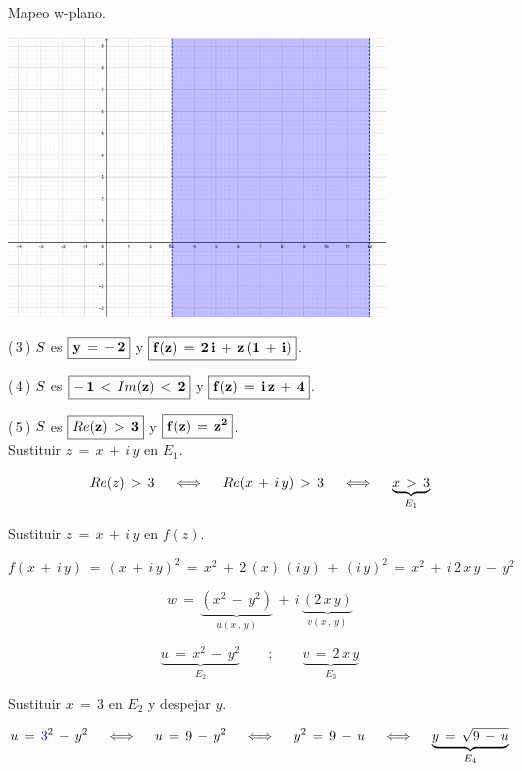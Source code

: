 \documentclass[a4paper,11pt,openany]{book}
\begin{document}
\textcolor{ao(english)}{} Mapeo w-plano.

\begin{center}
     \includegraphics[width=10cm]{Mapeo-Ej-2-w}
\end{center}

\textcolor{ao(english)}{(\,3\,)} $\mathnormal{S}$ es $\boxed{\bf{y\,=\,-\,2}}$ y $\boxed{\bf{f(z)\,=\,2\,i\,+\,z\,(1\,+\,i)}}$.

\textcolor{ao(english)}{(\,4\,)} $\mathnormal{S}$ es $\boxed{\bf{-\,1\,<\,\mathnormal{Im}(z)\,<\,2}}$ y $\boxed{\bf{f(z)\,=\,i\,z\,+\,4}}$.

\textcolor{ao(english)}{(\,5\,)} $\mathnormal{S}$ es $\boxed{\bf{\mathnormal{Re}(z)\,>\,3}}$ y $\boxed{\bf{f(z)\,=\,z^{2}}}$.\\

\textcolor{ao(english)}{} Sustituir $z\,=\,x\,+\,i\,y$ en $E_{1}$.

$$\mathnormal{Re}(z)\,>\,3 \quad\iff\quad \mathnormal{Re}(x\,+\,i\,y)\,>\,3 \quad\iff\quad \underbrace{x\,>\,3}_{E_{1}}$$

\textcolor{ao(english)}{} Sustituir $z\,=\,x\,+\,i\,y$ en $f(z)$.

$$f(x\,+\,i\,y)\,=\,(x\,+\,i\,y)^{2}\,=\,x^{2}\,+\,2\,(x)\,(i\,y)\,+\,(i\,y)^{2}\,=\,x^{2}\,+\,i\,2\,x\,y\,-\,y^{2}$$

$$w\,=\,\underbrace{(x^{2}\,-\,y^{2})}_{u(x\,,\,y)}\,+\,i\,\underbrace{(2\,x\,y)}_{v(x\,,\,y)}$$

$$\underbrace{u\,=\,x^{2}\,-\,y^{2}}_{E_{2}} \qquad;\qquad \underbrace{v\,=\,2\,x\,y}_{E_{3}}$$

\textcolor{ao(english)}{} Sustituir $x\,=\,3$ en $E_{2}$ y despejar $y$.

$$u\,=\,\textcolor{ao}{3}^{2}\,-\,y^{2} \quad\iff\quad u\,=\,9\,-\,y^{2} \quad\iff\quad y^{2}\,=\,9\,-\,u \quad\iff\quad \underbrace{y\,=\,\sqrt{9\,-\,u}}_{E_{4}}$$
\end{document}

